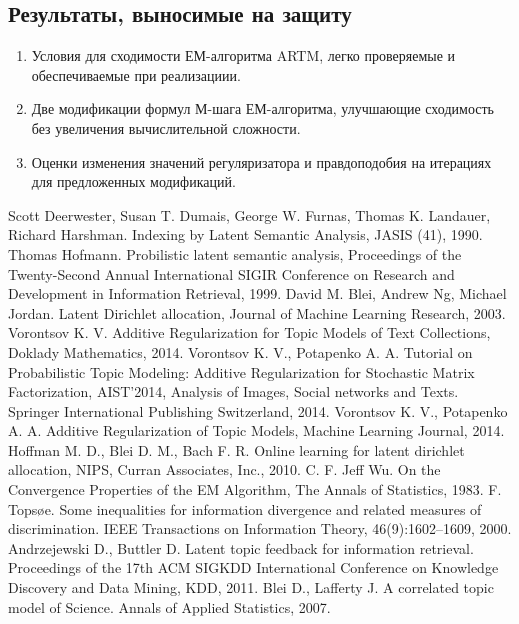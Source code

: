 \documentclass[12pt]{article}
\begin{document}
\subsection{Результаты, выносимые на защиту}
\begin{enumerate}
\item Условия для сходимости ЕМ-алгоритма ARTM, легко проверяемые и обеспечиваемые при реализациии.
\item Две модификации формул М-шага ЕМ-алгоритма, улучшающие сходимость без увеличения вычислительной сложности.
\item Оценки изменения значений регуляризатора и правдоподобия на итерациях для предложенных модификаций.
\end{enumerate}
\newpage
	\begin{thebibliography}{@@@@}
		Scott Deerwester, Susan T. Dumais, George W. Furnas, Thomas K. Landauer, Richard Harshman. Indexing by Latent Semantic Analysis,  JASIS (41), 1990.
		Thomas Hofmann. Probilistic latent semantic analysis, Proceedings of the Twenty-Second Annual International SIGIR Conference on Research and Development in Information Retrieval, 1999.
		David M. Blei, Andrew Ng, Michael Jordan. Latent Dirichlet allocation, Journal of Machine Learning Research,  2003.
		Vorontsov K. V. Additive Regularization for Topic Models of Text Collections, Doklady Mathematics, 2014.
		Vorontsov K. V., Potapenko A. A. Tutorial on Probabilistic Topic Modeling: Additive Regularization for Stochastic Matrix Factorization,  AIST’2014, Analysis of Images, Social networks and Texts. Springer International Publishing Switzerland, 2014.
		Vorontsov K. V., Potapenko A. A. Additive Regularization of Topic Models, Machine Learning Journal, 2014.
		Hoffman M. D., Blei D. M., Bach F. R. Online learning for latent dirichlet allocation, NIPS, Curran Associates, Inc., 2010.
		C. F. Jeff Wu. On the Convergence Properties of the EM Algorithm, The Annals of Statistics, 1983.
		F. Topsøe. Some inequalities for information divergence and related measures of discrimination. IEEE Transactions on Information Theory, 46(9):1602–1609, 2000.
		Andrzejewski D., Buttler D. Latent topic feedback for information retrieval. Proceedings of the 17th ACM SIGKDD International Conference on Knowledge Discovery and Data Mining, KDD, 2011.
		Blei D., Lafferty J. A correlated topic model of Science. Annals of Applied Statistics, 2007.

\end{thebibliography}
\end{document}
